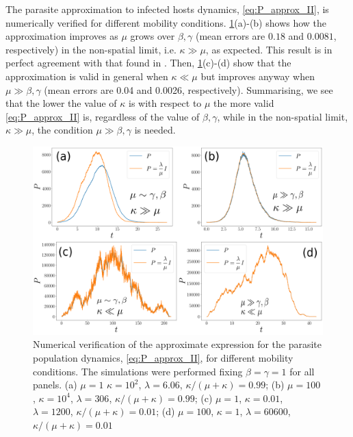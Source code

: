 The parasite approximation to infected hosts dynamics, \cref{eq:P_approx_II},
is numerically verified for different mobility conditions.
\cref{fig:P_approx}(a)-(b) shows how the approximation improves as $\mu$ grows
over $\beta,\gamma$ (mean errors are $0.18$ and $0.0081$, respectively) in the
non-spatial limit, i.e. $\kappa\gg\mu$, as expected. This result is in perfect
agreement with that found in \cite{GimenezRomero2021}. Then,
\cref{fig:P_approx}(c)-(d) show that the approximation is valid in general when
$\kappa\ll\mu$ but improves anyway when $\mu\gg\beta,\gamma$ (mean errors are
0.04 and 0.0026, respectively). Summarising, we see that the lower the value of
$\kappa$ is with respect to $\mu$ the more valid \cref{eq:P_approx_II} is,
regardless of the value of $\beta,\gamma$, while in the non-spatial limit,
$\kappa\gg\mu$, the condition $\mu\gg\beta,\gamma$ is needed.

\begin{figure}[H]
    \centering
    \includegraphics[width=\columnwidth]{Figures/P_approx.png}
    \caption{Numerical verification of the approximate expression for the
        parasite population dynamics, \cref{eq:P_approx_II}, for different
        mobility
        conditions. The simulations were performed fixing $\beta=\gamma=1$  for
        all
        panels. (a) $\mu=1$ $\kappa=10^2$, $\lambda=6.06$,
        $\kappa/(\mu+\kappa)=0.99$;
        (b) $\mu=100$, $\kappa=10^4$, $\lambda=306$,
        $\kappa/(\mu+\kappa)=0.99$; (c)
        $\mu=1$, $\kappa=0.01$, $\lambda=1200$, $\kappa/(\mu+\kappa)=0.01$; (d)
        $\mu=100$, $\kappa=1$, $\lambda=60600$,  $\kappa/(\mu+\kappa)=0.01$}
    \label{fig:P_approx}
\end{figure}

